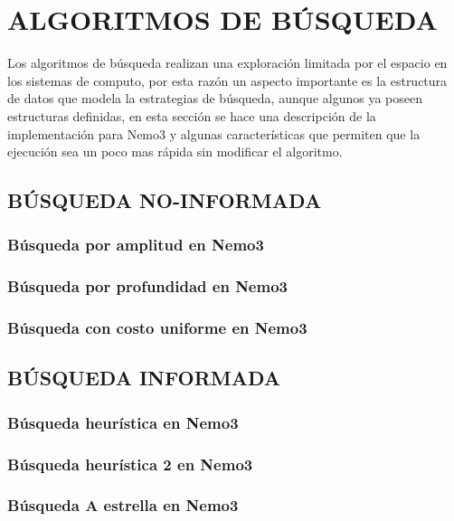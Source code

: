 \section{ALGORITMOS DE B\'USQUEDA}

Los algoritmos de b\'usqueda realizan una exploraci\'on limitada por el espacio en los sistemas de computo, por esta raz\'on un aspecto importante es la estructura de datos que modela la estrategias de b\'usqueda, aunque algunos ya poseen estructuras definidas, en esta secci\'on se hace una descripci\'on de la implementaci\'on  para Nemo3 y algunas caracter\'isticas que permiten que la ejecuci\'on sea un poco mas r\'apida sin modificar el algoritmo.

\subsection{B\'USQUEDA NO-INFORMADA}
\subsubsection{B\'usqueda por amplitud en Nemo3}
\subsubsection{B\'usqueda por profundidad en Nemo3}
\subsubsection{B\'usqueda con costo uniforme en Nemo3}

\subsection{B\'USQUEDA INFORMADA}
\subsubsection{B\'usqueda heur\'istica en Nemo3}
\subsubsection{B\'usqueda heur\'istica 2 en Nemo3}
\subsubsection{B\'usqueda A estrella en Nemo3}

